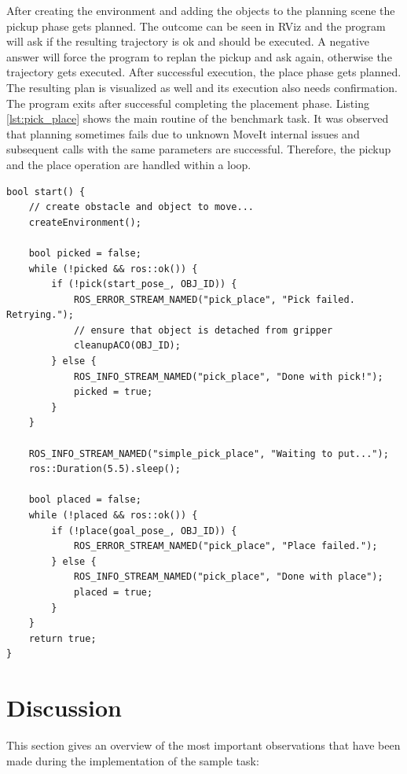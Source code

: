 After creating the environment and adding the objects to the planning scene the pickup phase gets planned. The outcome can be seen in RViz and the program will ask if the resulting trajectory is ok and should be executed. A negative answer will force the program to replan the pickup and ask again, otherwise the trajectory gets executed. After successful execution, the place phase gets planned. The resulting plan is visualized as well and its execution also needs confirmation. The program exits after successful completing the placement phase. Listing \ref{lst:pick_place} shows the main routine of the benchmark task. It was observed that planning sometimes fails due to unknown MoveIt internal issues and subsequent calls with the same parameters are successful. Therefore, the pickup and the place operation are handled within a loop. 

\lstset{style=customc}
\begin{minipage}{\linewidth}
\begin{lstlisting}[caption={Benchmark task main routine}, label=lst:pick_place]
bool start() {
	// create obstacle and object to move...
	createEnvironment();

	bool picked = false;
	while (!picked && ros::ok()) {
		if (!pick(start_pose_, OBJ_ID)) {
			ROS_ERROR_STREAM_NAMED("pick_place", "Pick failed. Retrying.");
			// ensure that object is detached from gripper
			cleanupACO(OBJ_ID);
		} else {
			ROS_INFO_STREAM_NAMED("pick_place",	"Done with pick!");
            picked = true;
		}
	}

	ROS_INFO_STREAM_NAMED("simple_pick_place", "Waiting to put...");
	ros::Duration(5.5).sleep();

	bool placed = false;
	while (!placed && ros::ok()) {
		if (!place(goal_pose_, OBJ_ID)) {
			ROS_ERROR_STREAM_NAMED("pick_place", "Place failed.");
		} else {
			ROS_INFO_STREAM_NAMED("pick_place", "Done with place");
			placed = true;
		}
	}
	return true;
}
\end{lstlisting}
\end{minipage}

\section{Discussion}

This section gives an overview of the most important observations that have been made during the implementation of the sample task:


